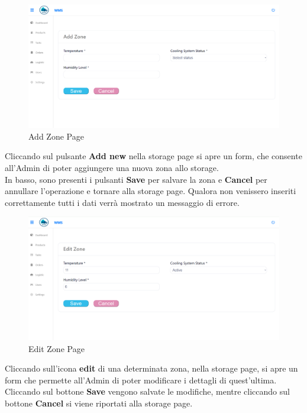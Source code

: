 \begin{figure}[H]
    \centering
    \includegraphics[width=\textwidth]{document/sections/img/Storyboard/addZone.png}
    \caption{Add Zone Page}
    \label{fig:addZonePages}
\end{figure}

Cliccando sul pulsante \textbf{Add new} nella storage page si apre un form, che consente
all'Admin di poter aggiungere una nuova zona allo storage.\\
In basso, sono presenti i pulsanti \textbf{Save} per salvare la zona e \textbf{Cancel} per annullare l'operazione
e tornare alla storage page.
Qualora non venissero inseriti correttamente tutti i dati verrà mostrato un messaggio di errore.

\begin{figure}[H]
    \centering
    \includegraphics[width=\textwidth]{document/sections/img/Storyboard/editZonePage.png}
    \caption{Edit Zone Page}
    \label{fig:editZonePage}
\end{figure}

Cliccando sull'icona \textbf{edit} di una determinata zona, nella storage page, si apre un form
che permette all'Admin di poter modificare i dettagli di quest'ultima.\\
Cliccando sul bottone \textbf{Save} vengono salvate le modifiche, mentre cliccando sul bottone \textbf{Cancel} si viene
riportati alla storage page.


